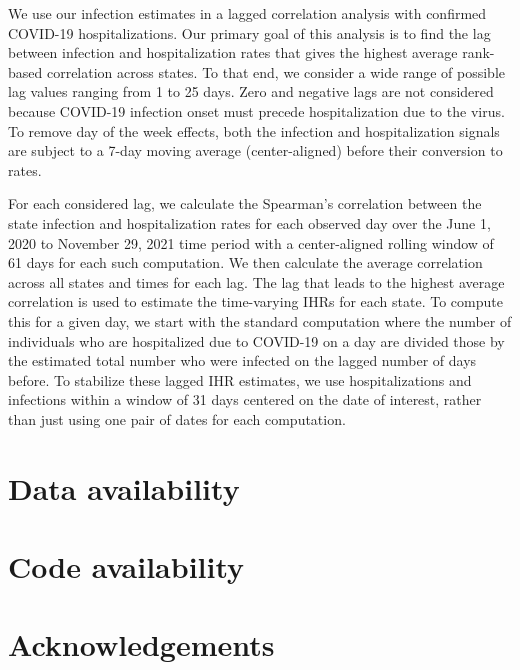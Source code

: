 \documentclass{article}
\begin{document}
We use our infection estimates in a lagged correlation analysis with confirmed
COVID-19 hospitalizations. Our primary goal of this analysis is to find the lag
between infection and hospitalization rates that gives the highest average
rank-based correlation across \US states. To that end, we consider a wide range
of possible lag values ranging from 1 to 25 days. Zero and negative lags are not
considered because COVID-19 infection onset must precede hospitalization due to
the virus. To remove day of the week effects, both the infection and
hospitalization signals are subject to a 7-day moving average (center-aligned)
before their conversion to rates.

For each considered lag, we calculate the Spearman's correlation between the 
state infection and hospitalization rates for each observed day 
over the June 1, 2020 to November 29, 2021
time period %
with a center-aligned rolling window of 61 days for each such computation.
We then calculate the average correlation across all states and times for each lag. 
The lag that leads to the highest average correlation is used to estimate 
the time-varying IHRs for each
state. To compute this for a given day, we start with the standard computation where the number of individuals who are
hospitalized due to COVID-19 on a day are divided those by the estimated total number
who were infected on the lagged number of days before. To stabilize these lagged IHR estimates, we 
use hospitalizations and infections within a window of 31 days centered
on the date of interest, rather than just using one pair of dates for each computation.

\section*{Data availability}
\section*{Code availability}

\clearpage





\section*{Acknowledgements}
\end{document}
